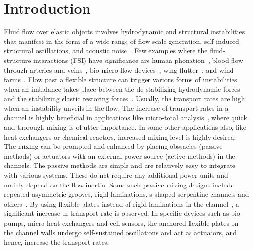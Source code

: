 \documentclass[aps,pre,twocolumn,aps,longbibliography]{revtex4-1}
\begin{document}
	
	\maketitle
	
	
	\section{Introduction}
	Fluid flow over elastic objects involves hydrodynamic and structural instabilities that manifest in the form of a wide range of flow scale generation, self-induced structural oscillations, and acoustic noise~\cite{Balachandar1999, Zhang2000, Hall2001, Mahadevan2004, Vandenberghe2004, Shelley2011}. Few examples where the fluid-structure interactions (FSI) have significance are human phonation~\citep{Mittal2013}, blood flow through arteries and veins~\citep{Manz2002,Verzicco2009}, bio micro-flow devices~\cite{Khatvakar2007}, wing flutter~\cite{Taneda1968}, and wind farms~\cite{Klienstreuer2009}. Flow past a flexible structure can trigger various forms of instabilities when an imbalance takes place between the de-stabilizing hydrodynamic forces and the stabilizing elastic restoring forces~\citep{Taneda1968, Zhang2000, Watanabe2002, Eloy2008, ZhuPeskin2002, Alben2008}. Usually, the transport rates are high when an instability unveils in the flow. The increase of transport rates in a channel is highly beneficial in applications like micro-total analysis~\citep{Manz2002}, where quick and thorough mixing is of utter importance. In some other applications also, like heat exchangers or chemical reactors, increased mixing level is highly desired. The mixing can be prompted and enhanced by placing obstacles (passive methods) or actuators with an external power source (active methods) in the channels. The passive methods are simple and are relatively easy to integrate with various systems. These do not require any additional power units and mainly depend on the flow inertia. Some such passive mixing designs include repeated asymmetric grooves, rigid laminations, s-shaped serpentine channels and others~\citep{Whitesides2002, Nguyen2005, Squires2005, Kashid2011, Kang2015}. By using flexible plates instead of rigid laminations in the channel~\cite{LambertRangel2010, Khatvakar2007}, a significant increase in transport rate is observed. In specific devices such as bio-pumps, micro heat exchangers and cell sensors, the anchored flexible plates on the channel walls undergo self-sustained oscillations and act as actuators, and hence, increase the transport rates.
	
\end{document}
